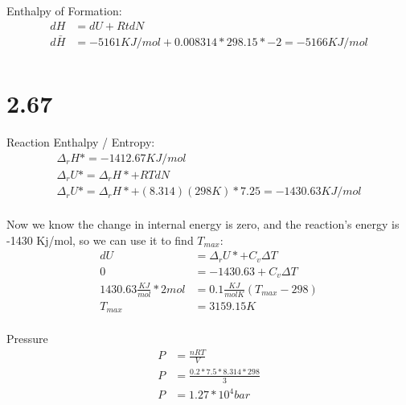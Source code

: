 \documentclass[10pt]{article} %
\begin{document}
Enthalpy of Formation:
\begin{align}
  dH &= dU + RtdN\\
  d\bar{H} &= -5161KJ/mol + 0.008314 * 298.15 * -2 = -5166KJ/mol\\  
\end{align}

\section{2.67}




Reaction Enthalpy / Entropy:
\begin{align}
  \Delta_rH* = -1412.67 KJ/mol\\
  \Delta_rU* = \Delta_rH* + RTdN\\
  \Delta_rU* = \Delta_rH* + (8.314)(298K)*7.25 = -1430.63 KJ/mol\\  
\end{align}

Now we know the change in internal energy is zero, and the reaction's energy is -1430 Kj/mol, so we can use it to find $T_{max}$:
\begin{align}
  dU &= \Delta_rU* + C_v\Delta T\\
  0 &= -1430.63 + C_v\Delta T\\
  1430.63 \frac{KJ}{mol} * 2 mol &=  0.1 \frac{KJ}{mol K}(T_{max} - 298)\\
  T_{max} &= 3159.15K\\
\end{align}

Pressure
\begin{align}
  P &= \frac{nRT}{V}\\
  P &= \frac{0.2  * 7.5 * 8.314 * 298}{3}\\
  P &= 1.27*10^4 bar\\
\end{align}
\end{document}

